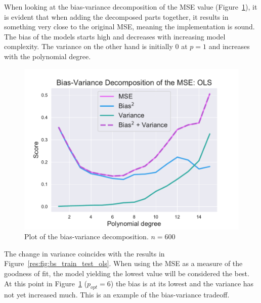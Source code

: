 \documentclass[twocolumn,english,notitlepage]{article}
\begin{document}
            When looking at the bias-variance decomposition of the MSE value (Figure~\ref{res:fig:bs_OLS_bias_variance_tradeoff_ols}), it is evident that when adding the decomposed parts together, it results in something very close to the original MSE, meaning the implementation is sound. The bias of the models starts high and decreases with increasing model complexity. The variance on the other hand is initially $0$ at $p=1$ and increases with the polynomial degree. 
            \begin{figure}[ht]
                \centering
                \includegraphics[width=\linewidth]{BS_Bias_var_decomp_OLS.pdf}
                \caption{Plot of the bias-variance decomposition. $n=600$ }
                \label{res:fig:bs_OLS_bias_variance_tradeoff_ols}
            \end{figure}

            The change in variance coincides with the results in Figure~\ref{res:fig:bs_train_test_ols}.
            When using the MSE as a measure of the goodness of fit, the model yielding the lowest value will be considered the best. At this point in Figure~\ref{res:fig:bs_OLS_bias_variance_tradeoff_ols} ($p_{opt}=6$) the bias is at its lowest and the variance has not yet increased much. This is an example of the bias-variance tradeoff.  
\end{document}
